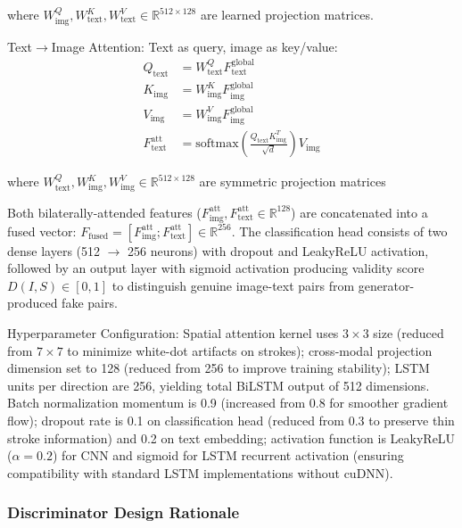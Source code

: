 \documentclass[journal]{IEEEtran}
\begin{document}
\noindent where $W_{\text{img}}^Q, W_{\text{text}}^K, W_{\text{text}}^V \in \mathbb{R}^{512 \times 128}$ are learned projection matrices.

Text$\rightarrow$Image Attention: Text as query, image as key/value:
\begin{align}
Q_{\text{text}} &= W_{\text{text}}^Q F_{\text{text}}^{\text{global}} \nonumber\\
K_{\text{img}} &= W_{\text{img}}^K F_{\text{img}}^{\text{global}} \nonumber\\
V_{\text{img}} &= W_{\text{img}}^V F_{\text{img}}^{\text{global}} \label{eq:cross_text_proj}\\
F_{\text{text}}^{\text{att}} &= \text{softmax}\left(\frac{Q_{\text{text}} K_{\text{img}}^T}{\sqrt{d}}\right) V_{\text{img}} \label{eq:cross_text_att}
\end{align}

\noindent where $W_{\text{text}}^Q, W_{\text{img}}^K, W_{\text{img}}^V \in \mathbb{R}^{512 \times 128}$ are symmetric projection matrices

Both bilaterally-attended features ($F_{\text{img}}^{\text{att}}, F_{\text{text}}^{\text{att}} \in \mathbb{R}^{128}$) are concatenated into a fused vector: $F_{\text{fused}} = [F_{\text{img}}^{\text{att}}; F_{\text{text}}^{\text{att}}] \in \mathbb{R}^{256}$. The classification head consists of two dense layers (512 $\rightarrow$ 256 neurons) with dropout and LeakyReLU activation, followed by an output layer with sigmoid activation producing validity score $D(I, S) \in [0, 1]$ to distinguish genuine image-text pairs from generator-produced fake pairs.

Hyperparameter Configuration: Spatial attention kernel uses $3 \times 3$ size (reduced from $7 \times 7$ to minimize white-dot artifacts on strokes); cross-modal projection dimension set to 128 (reduced from 256 to improve training stability); LSTM units per direction are 256, yielding total BiLSTM output of 512 dimensions. Batch normalization momentum is 0.9 (increased from 0.8 for smoother gradient flow); dropout rate is 0.1 on classification head (reduced from 0.3 to preserve thin stroke information) and 0.2 on text embedding; activation function is LeakyReLU ($\alpha=0.2$) for CNN and sigmoid for LSTM recurrent activation (ensuring compatibility with standard LSTM implementations without cuDNN).

\subsubsection{Discriminator Design Rationale}
\end{document}
